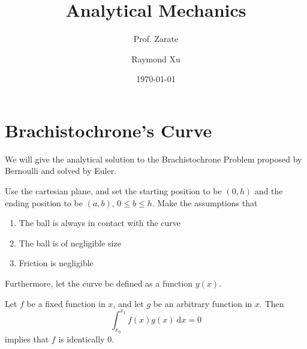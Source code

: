 \documentclass[11pt]{scrartcl}
\begin{document}
\title{Analytical Mechanics}
\subtitle{Prof. Zarate}
\author{Raymond Xu}
\date{\today}
\maketitle



\section{Brachistochrone's Curve}

We will give the analytical solution to the Brachistochrone Problem proposed by Bernoulli and solved by Euler. 

Use the cartesian plane, and set the starting position to be $(0,h)$ and the ending position to be $(a,b)$, $0 \le b \le h$. Make the assumptions that 

\begin{enumerate}
    \item The ball is always in contact with the curve
    \item The ball is of negligible size
    \item Friction is negligible
    
\end{enumerate}

Furthermore, let the curve be defined as a function $y(x)$. 

\begin{lemma*}
    Let $f$ be a fixed function in $x$, and let $g$ be an arbitrary function in $x$. Then \[\int_{x_0} ^{x_1} f(x) g(x) \ \mathrm dx = 0\] implies that $f$ is identically $0$. 
\end{lemma*}
\end{document}
